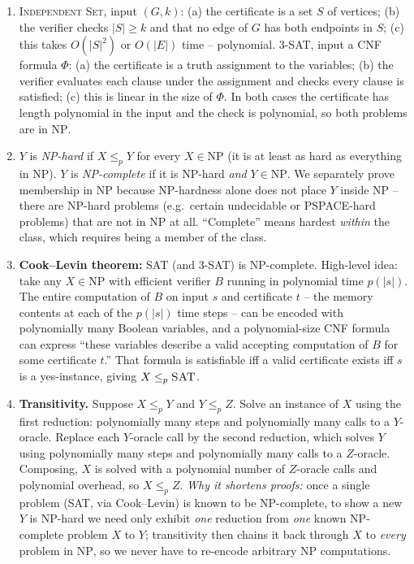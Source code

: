 \documentclass[11pt]{article}
\begin{document}
\begin{enumerate}[label=\textbf{A\arabic*.}, leftmargin=2.2em]
\item \textsc{Independent Set}, input $(G, k)$: (a) the certificate is a set $S$ of
vertices; (b) the verifier checks $|S| \ge k$ and that no edge of $G$ has both endpoints in
$S$; (c) this takes $O(|S|^2)$ or $O(|E|)$ time -- polynomial. \textsc{3-SAT}, input a CNF
formula $\Phi$: (a) the certificate is a truth assignment to the variables; (b) the verifier
evaluates each clause under the assignment and checks every clause is satisfied; (c) this is
linear in the size of $\Phi$. In both cases the certificate has length polynomial in the
input and the check is polynomial, so both problems are in $\mathrm{NP}$.

\item $Y$ is \emph{NP-hard} if $X \le_p Y$ for every $X \in \mathrm{NP}$ (it is at least as
hard as everything in $\mathrm{NP}$). $Y$ is \emph{NP-complete} if it is NP-hard \emph{and}
$Y \in \mathrm{NP}$. We separately prove membership in $\mathrm{NP}$ because NP-hardness
alone does not place $Y$ inside $\mathrm{NP}$ -- there are NP-hard problems (e.g.\ certain
undecidable or PSPACE-hard problems) that are not in $\mathrm{NP}$ at all. ``Complete''
means hardest \emph{within} the class, which requires being a member of the class.

\item \textbf{Cook--Levin theorem:} \textsc{SAT} (and \textsc{3-SAT}) is NP-complete.
High-level idea: take any $X \in \mathrm{NP}$ with efficient verifier $B$ running in
polynomial time $p(|s|)$. The entire computation of $B$ on input $s$ and certificate $t$ --
the memory contents at each of the $p(|s|)$ time steps -- can be encoded with polynomially
many Boolean variables, and a polynomial-size CNF formula can express ``these variables
describe a valid accepting computation of $B$ for some certificate $t$.'' That formula is
satisfiable iff a valid certificate exists iff $s$ is a yes-instance, giving $X \le_p
\textsc{SAT}$.

\item \textbf{Transitivity.} Suppose $X \le_p Y$ and $Y \le_p Z$. Solve an instance of $X$
using the first reduction: polynomially many steps and polynomially many calls to a
$Y$-oracle. Replace each $Y$-oracle call by the second reduction, which solves $Y$ using
polynomially many steps and polynomially many calls to a $Z$-oracle. Composing, $X$ is
solved with a polynomial number of $Z$-oracle calls and polynomial overhead, so $X \le_p
Z$. \emph{Why it shortens proofs:} once a single problem (\textsc{SAT}, via Cook--Levin) is
known to be NP-complete, to show a new $Y$ is NP-hard we need only exhibit \emph{one}
reduction from \emph{one} known NP-complete problem $X$ to $Y$; transitivity then chains it
back through $X$ to \emph{every} problem in $\mathrm{NP}$, so we never have to re-encode
arbitrary NP computations.


\end{enumerate}
\end{document}
